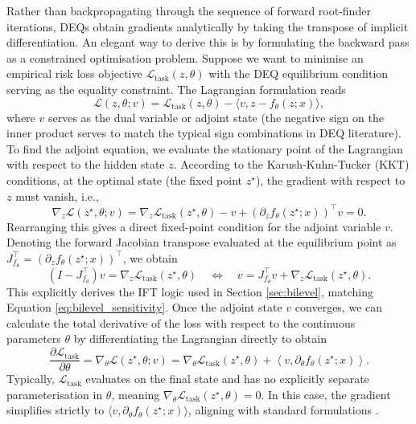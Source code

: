 Rather than backpropagating through the sequence of forward root-finder iterations, DEQs obtain gradients analytically by taking the transpose of implicit differentiation. An elegant way to derive this is by formulating the backward pass as a constrained optimisation problem. Suppose we want to minimise an empirical risk loss objective $\mathcal{L}_{\text{task}}(z, \theta)$ with the DEQ equilibrium condition serving as the equality constraint. The Lagrangian formulation reads
\begin{equation*}
    \mathcal{L}(z, \theta; v) = \mathcal{L}_{\text{task}}(z, \theta) - \langle v, z - f_\theta(z; x) \rangle,
\end{equation*}
where $v$ serves as the dual variable or adjoint state (the negative sign on the inner product serves to match the typical sign combinations in DEQ literature). To find the adjoint equation, we evaluate the stationary point of the Lagrangian with respect to the hidden state $z$. According to the Karush-Kuhn-Tucker (KKT) conditions, at the optimal state (the fixed point $z^\star$), the gradient with respect to $z$ must vanish, i.e.,
\begin{equation*}
    \nabla_z \mathcal{L}(z^\star, \theta; v) = \nabla_z \mathcal{L}_{\text{task}}(z^\star, \theta) - v + (\partial_z f_\theta(z^\star; x))^{\top} v = 0.
\end{equation*}
Rearranging this gives a direct fixed-point condition for the adjoint variable $v$. Denoting the forward Jacobian transpose evaluated at the equilibrium point as $J_{f_\theta}^{\top} = (\partial_z f_\theta(z^\star; x))^{\top}$, we obtain
\begin{equation*}
    (I - J_{f_\theta}^{\top}) v = \nabla_z \mathcal{L}_{\text{task}}(z^\star, \theta) 
    \quad \Longleftrightarrow \quad
    v = J_{f_\theta}^{\top} v + \nabla_z \mathcal{L}_{\text{task}}(z^\star, \theta).
\end{equation*}
This explicitly derives the IFT logic used in Section \ref{sec:bilevel}, matching Equation \eqref{eq:bilevel_sensitivity}. Once the adjoint state $v$ converges, we can calculate the total derivative of the loss with respect to the continuous parameters $\theta$ by differentiating the Lagrangian directly to obtain
\begin{equation*}
    \frac{\partial \mathcal{L}_{\text{task}}}{\partial \theta} = \nabla_\theta \mathcal{L}(z^\star, \theta; v) = \nabla_\theta \mathcal{L}_{\text{task}}(z^\star, \theta) + \left\langle v, \partial_\theta f_\theta(z^\star; x) \right\rangle.
\end{equation*}
Typically, $\mathcal{L}_{\text{task}}$ evaluates on the final state and has no explicitly separate parameterisation in $\theta$, meaning $\nabla_\theta \mathcal{L}_{\text{task}}(z^\star, \theta) = 0$. In this case, the gradient simplifies strictly to $\langle v, \partial_\theta f_\theta(z^\star; x) \rangle$, aligning with standard formulations \cite{bai2019deep, riccio2022regularization}.

